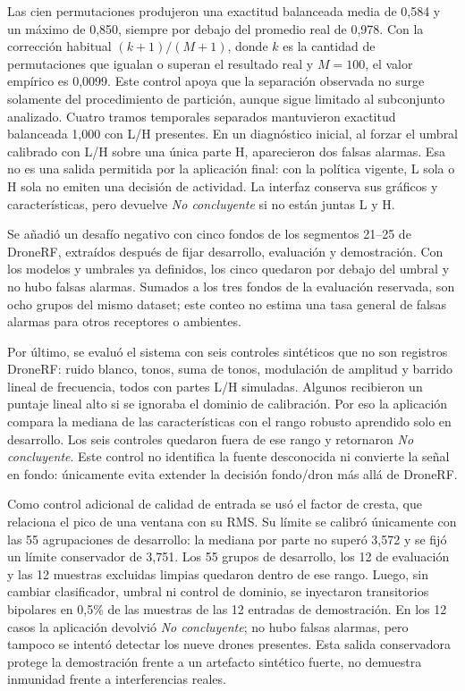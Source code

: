 \documentclass[11pt,a4paper]{article}
\begin{document}
Las cien permutaciones produjeron una exactitud balanceada media de 0,584 y un máximo de
0,850, siempre por debajo del promedio real de 0,978. Con la corrección habitual
$(k+1)/(M+1)$, donde $k$ es la cantidad de permutaciones que igualan o superan el resultado
real y $M=100$, el valor empírico es 0,0099. Este control apoya que la separación observada
no surge solamente del procedimiento de partición, aunque sigue limitado al subconjunto
analizado. Cuatro tramos temporales separados mantuvieron exactitud balanceada
1,000 con L/H presentes. En un diagnóstico inicial, al forzar el umbral calibrado con L/H
sobre una única parte H, aparecieron dos falsas alarmas. Esa no es una salida permitida por
la aplicación final: con la política vigente, L sola o H sola no emiten una decisión de
actividad. La interfaz conserva sus gráficos y características, pero devuelve \emph{No
concluyente} si no están juntas L y H.

Se añadió un desafío negativo con cinco fondos de los segmentos 21--25 de DroneRF,
extraídos después de fijar desarrollo, evaluación y demostración. Con los modelos y
umbrales ya definidos, los cinco quedaron por debajo del umbral y no hubo falsas alarmas.
Sumados a los tres fondos de la evaluación reservada, son ocho grupos del mismo dataset;
este conteo no estima una tasa general de falsas alarmas para otros receptores o ambientes.

Por último, se evaluó el sistema con seis controles sintéticos que no son registros DroneRF:
ruido blanco, tonos, suma de tonos, modulación de amplitud y barrido lineal de frecuencia,
todos con partes L/H simuladas. Algunos
recibieron un puntaje lineal alto si se ignoraba el dominio de calibración. Por eso la
aplicación compara la mediana de las características con el rango robusto aprendido solo
en desarrollo. Los seis controles quedaron fuera de ese rango y retornaron
\emph{No concluyente}. Este control no identifica la fuente desconocida ni convierte la
señal en fondo: únicamente evita extender la decisión fondo/dron más allá de DroneRF.

Como control adicional de calidad de entrada se usó el factor de cresta, que relaciona el
pico de una ventana con su RMS. Su límite se calibró únicamente con las 55 agrupaciones de
desarrollo: la mediana por parte no superó 3,572 y se fijó un límite conservador de 3,751.
Los 55 grupos de desarrollo, los 12 de evaluación y las 12 muestras excluidas limpias
quedaron dentro de ese rango. Luego, sin cambiar clasificador, umbral ni control de
dominio, se inyectaron transitorios bipolares en 0,5\% de las muestras de las 12 entradas
de demostración. En los 12 casos la aplicación devolvió \emph{No concluyente}; no hubo
falsas alarmas, pero tampoco se intentó detectar los nueve drones presentes. Esta salida
conservadora protege la demostración frente a un artefacto sintético fuerte, no demuestra
inmunidad frente a interferencias reales.
\end{document}
